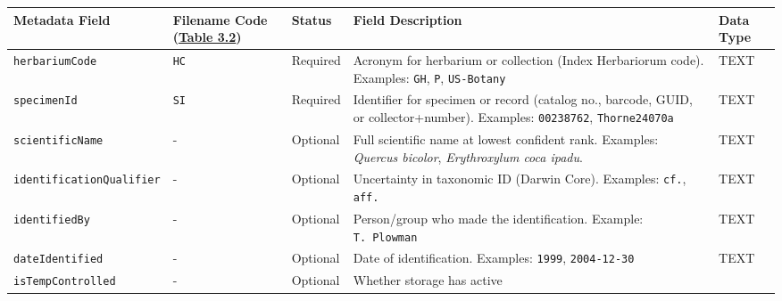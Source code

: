 \documentclass[
  letterpaper,
  DIV=11,
  numbers=noendperiod]{scrreprt}
\begin{document}
\begin{longtable}[]{@{}
  >{\raggedright\arraybackslash}p{}
  >{\raggedright\arraybackslash}p{}
  >{\raggedright\arraybackslash}p{}
  >{\raggedright\arraybackslash}p{}
  >{\raggedright\arraybackslash}p{}@{}}
\toprule\noalign{}
\begin{minipage}[b]{\linewidth}\raggedright
Metadata Field
\end{minipage} & \begin{minipage}[b]{\linewidth}\raggedright
Filename Code (\hyperref[tbl-3-2]{Table 3.2})
\end{minipage} & \begin{minipage}[b]{\linewidth}\raggedright
Status
\end{minipage} & \begin{minipage}[b]{\linewidth}\raggedright
Field Description
\end{minipage} & \begin{minipage}[b]{\linewidth}\raggedright
Data Type
\end{minipage} \\
\midrule\noalign{}
\endhead
\bottomrule\noalign{}
\endlastfoot
\texttt{herbariumCode} & \texttt{HC} & Required & Acronym for herbarium
or collection (Index Herbariorum code). Examples: \texttt{GH},
\texttt{P}, \texttt{US-Botany} & TEXT \\
\texttt{specimenId} & \texttt{SI} & Required & Identifier for specimen
or record (catalog no., barcode, GUID, or collector+number). Examples:
\texttt{00238762}, \texttt{Thorne24070a} & TEXT \\
\texttt{scientificName} & - & Optional & Full scientific name at lowest
confident rank. Examples: \emph{Quercus bicolor}, \emph{Erythroxylum
coca ipadu}. & TEXT \\
\texttt{identificationQualifier} & - & Optional & Uncertainty in
taxonomic ID (Darwin Core). Examples: \texttt{cf.}, \texttt{aff.} &
TEXT \\
\texttt{identifiedBy} & - & Optional & Person/group who made the
identification. Example: \texttt{T.\ Plowman} & TEXT \\
\texttt{dateIdentified} & - & Optional & Date of identification.
Examples: \texttt{1999}, \texttt{2004-12-30} & TEXT \\
\texttt{isTempControlled} & - & Optional & Whether storage has active

\end{longtable}
\end{document}
